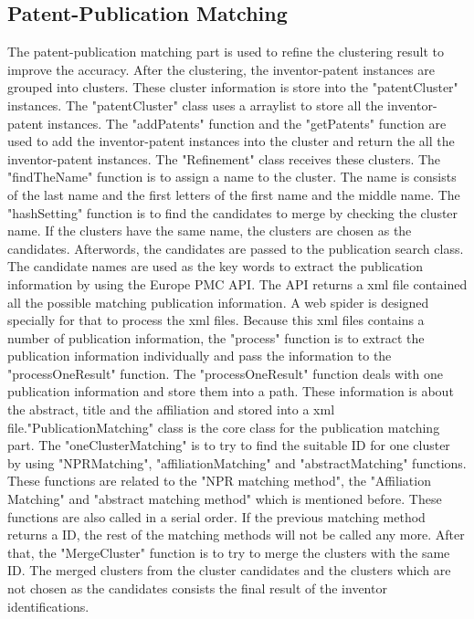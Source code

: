 \subsection{Patent-Publication Matching}
The patent-publication matching part is used to refine the clustering result to improve the accuracy. After the clustering, the inventor-patent instances are grouped into clusters. These cluster information is store into the "patentCluster" instances. The "patentCluster" class uses a arraylist to store all the inventor-patent instances. The "addPatents" function and the "getPatents" function are used to add the inventor-patent instances into the cluster and return the all the inventor-patent instances. The "Refinement" class receives these clusters. The "findTheName" function is to assign a name to the cluster. The name is consists of the last name and the first letters of the first name and the middle name. The "hashSetting" function is to find the candidates to merge by checking the cluster name. If the clusters have the same name, the clusters are chosen as the candidates. Afterwords, the candidates are passed to the publication search class. The candidate names are used as the key words to extract the publication information by using the Europe PMC API.  The API returns a xml file contained all the possible matching publication information. A web spider is designed specially for that to process the xml files. Because this xml files contains a number of publication information, the "process" function is to extract the publication information individually and pass the information to the "processOneResult" function. The "processOneResult" function deals with one publication information and store them into a path. These information is about the abstract, title and the affiliation and stored into a xml file."PublicationMatching" class is the core class for the publication matching part. The "oneClusterMatching" is to try to find the suitable ID for one cluster by using "NPRMatching", "affiliationMatching"  and  "abstractMatching" functions.  These functions are related to the  "NPR matching method", the "Affiliation Matching" and "abstract matching method" which is mentioned before. These functions are also called in a serial order. If the previous matching method returns a ID, the rest of the matching methods will not be called any more.  After that, the "MergeCluster" function is to try to merge the clusters with the same ID. The merged clusters from the cluster candidates and the clusters which are not chosen as the candidates consists the final result of the inventor identifications.







